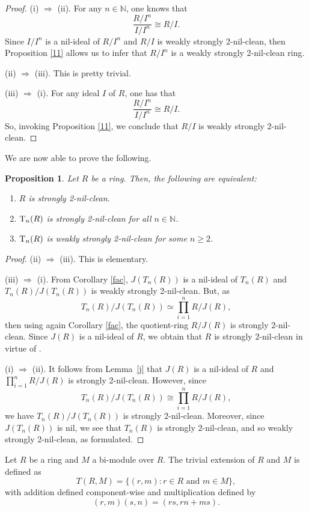 \documentclass[12pt]{amsart}
\newtheorem{proposition}[theorem]{Proposition}
\theoremstyle{definition}
\begin{document}
\begin{proof}
(i) $\Longrightarrow$ (ii). For any $n \in \mathbb{N}$, one knows that $$\dfrac{R/I^n}{I/I^n} \cong R/I.$$ Since $I/I^n$ is a nil-ideal of $R/I^n$ and $R/I$ is weakly strongly 2-nil-clean, then Proposition \ref {11} allows us to infer that $R/I^n$ is a weakly strongly 2-nil-clean ring.

(ii) $\Longrightarrow$ (iii). This is pretty trivial.

(iii) $\Longrightarrow$ (i). For any ideal $I$ of $R$, one has that $$\dfrac{R/I^n}{I/I^n} \cong R/I.$$ So, invoking Proposition \ref{11}, we conclude that $R/I$ is weakly strongly 2-nil-clean.
\end{proof}

We are now able to prove the following.

\begin{proposition}\label{12}
Let $R$ be a ring. Then, the following are equivalent:
\begin{enumerate}
\item
$R$ is strongly 2-nil-clean.
\item
${\rm T}_{n}(R)$ is strongly 2-nil-clean for all $n\in \mathbb{N}$.
\item
${\rm T}_n(R)$ is weakly strongly 2-nil-clean for some $n\geq 2$.
\end{enumerate}
\end{proposition}

\begin{proof}
(ii) $\Rightarrow$ (iii). This is elementary.

(iii) $\Rightarrow$ (i). From Corollary \ref{fac}, $J(T_n(R))$ is a nil-ideal of $T_n(R)$ and $T_n(R)/J(T_n(R))$ is weakly strongly 2-nil-clean. But, as $$T_n(R)/J(T_n(R))\simeq \prod_{i=1}^n R/J(R),$$ then using again Corollary \ref{fac}, the quotient-ring $R/J(R)$ is strongly 2-nil-clean. Since $J(R)$ is a nil-ideal of $R$, we obtain that $R$ is strongly 2-nil-clean in virtue of \cite{chen}.

(i) $\Rightarrow$ (ii). It follows from Lemma~\ref{j} that $J(R)$ is a nil-ideal of $R$ and $\prod_{i=1}^n R/J(R)$ is strongly 2-nil-clean. However, since $$T_n(R)/J(T_n(R)) \cong \prod_{i=1}^nR/J(R),$$ we have $T_n(R)/J(T_n(R))$ is strongly 2-nil-clean. Moreover, since $J(T_n(R))$ is nil, we see that $T_n(R)$ is strongly 2-nil-clean, and so weakly strongly 2-nil-clean, as formulated.
\end{proof}

Let $R$ be a ring and $M$ a bi-module over $R$. The trivial extension of $R$ and $M$ is defined as
\[ T(R, M) = \{(r, m) : r \in R \text{ and } m \in M\}, \]
with addition defined component-wise and multiplication defined by
\[ (r, m)(s, n) = (rs, rn + ms). \]
\end{document}
